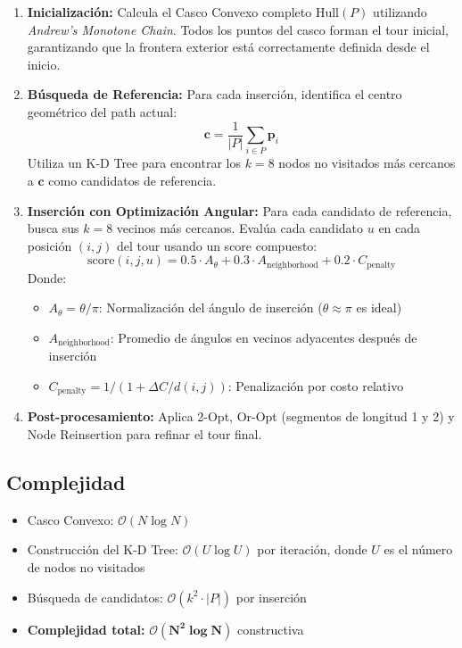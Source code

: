 \documentclass[12pt, a4paper]{article}
\begin{document}
\begin{enumerate}
    \item \textbf{Inicialización:} Calcula el Casco Convexo completo $\text{Hull}(P)$ utilizando \textit{Andrew's Monotone Chain}. Todos los puntos del casco forman el tour inicial, garantizando que la frontera exterior está correctamente definida desde el inicio.
    
    \item \textbf{Búsqueda de Referencia:} Para cada inserción, identifica el centro geométrico del path actual:
    \[
    \mathbf{c} = \frac{1}{|P|} \sum_{i \in P} \mathbf{p}_i
    \]
    Utiliza un K-D Tree para encontrar los $k=8$ nodos no visitados más cercanos a $\mathbf{c}$ como candidatos de referencia.
    
    \item \textbf{Inserción con Optimización Angular:} Para cada candidato de referencia, busca sus $k=8$ vecinos más cercanos. Evalúa cada candidato $u$ en cada posición $(i, j)$ del tour usando un score compuesto:
    \[
    \text{score}(i, j, u) = 0.5 \cdot A_\theta + 0.3 \cdot A_{\text{neighborhood}} + 0.2 \cdot C_{\text{penalty}}
    \]
    Donde:
    \begin{itemize}
        \item $A_\theta = \theta / \pi$: Normalización del ángulo de inserción ($\theta \approx \pi$ es ideal)
        \item $A_{\text{neighborhood}}$: Promedio de ángulos en vecinos adyacentes después de inserción
        \item $C_{\text{penalty}} = 1 / (1 + \Delta C / d(i,j))$: Penalización por costo relativo
    \end{itemize}
    
    \item \textbf{Post-procesamiento:} Aplica 2-Opt, Or-Opt (segmentos de longitud 1 y 2) y Node Reinsertion para refinar el tour final.
\end{enumerate}

\subsection{Complejidad}
\begin{itemize}
    \item Casco Convexo: $\mathcal{O}(N \log N)$
    \item Construcción del K-D Tree: $\mathcal{O}(U \log U)$ por iteración, donde $U$ es el número de nodos no visitados
    \item Búsqueda de candidatos: $\mathcal{O}(k^2 \cdot |P|)$ por inserción
    \item \textbf{Complejidad total:} $\mathbf{\mathcal{O}(N^2 \log N)}$ constructiva
\end{itemize}
\end{document}
